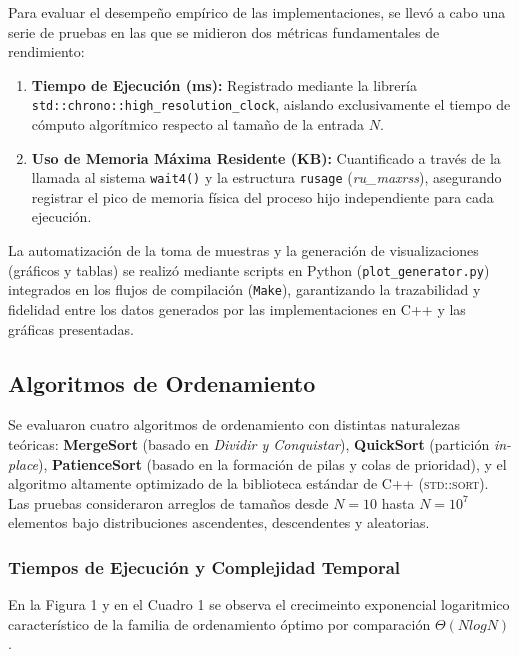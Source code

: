 Para evaluar el desempeño empírico de las implementaciones, se llevó a cabo una serie de pruebas en las que se midieron dos métricas fundamentales de rendimiento:
\begin{enumerate}
    \item \textbf{Tiempo de Ejecución (ms):} Registrado mediante la librería \texttt{std::chrono::high\_resolution\_clock}, 
    aislando exclusivamente el tiempo de cómputo algorítmico respecto al tamaño de la entrada $N$.
    \item \textbf{Uso de Memoria Máxima Residente (KB):} Cuantificado a través de la llamada al sistema \texttt{wait4()} y la estructura \texttt{rusage} (\textit{ru\_maxrss}), asegurando registrar el pico de memoria física del proceso hijo independiente para cada ejecución.
\end{enumerate}

La automatización de la toma de muestras y la generación de visualizaciones (gráficos y tablas) se realizó mediante scripts en Python (\texttt{plot\_generator.py}) integrados en los flujos de compilación (\texttt{Make}), garantizando la trazabilidad y fidelidad entre los datos generados por las implementaciones en C++ y las gráficas presentadas.

\subsection{Algoritmos de Ordenamiento}

Se evaluaron cuatro algoritmos de ordenamiento con distintas naturalezas teóricas: \textbf{MergeSort} (basado en \textit{Dividir y Conquistar}), \textbf{QuickSort} (partición \textit{in-place}), \textbf{PatienceSort} (basado en la formación de pilas y colas de prioridad), y el algoritmo altamente optimizado de la biblioteca estándar de C++ (\textsc{std::sort}). Las pruebas consideraron arreglos de tamaños desde $N = 10$ hasta $N = 10^7$ elementos bajo distribuciones ascendentes, descendentes y aleatorias.

\subsubsection{Tiempos de Ejecución y Complejidad Temporal}

En la Figura 1 y en el Cuadro 1 se observa el crecimeinto exponencial logaritmico característico de la familia de ordenamiento óptimo por comparación $\Theta(N log N)$.

